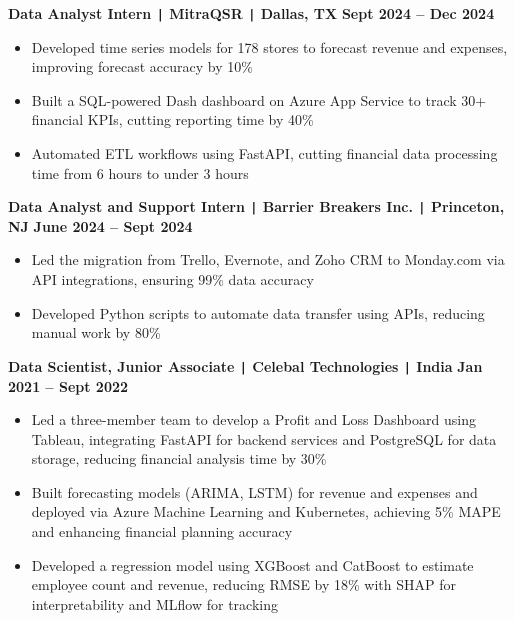 \documentclass[10pt]{article}
\begin{document}
\vspace{-0.2cm}
\noindent
\textbf{Data Analyst Intern \texttt{|} MitraQSR \texttt{|} Dallas, TX} \hfill \textbf{Sept 2024 -- Dec 2024} 
\vspace{-0.15cm}
\begin{itemize}[leftmargin=0.5cm, itemsep=0pt]

    \item Developed time series models for 178 stores to forecast revenue and expenses, improving forecast accuracy by 10\%

    \item Built a SQL-powered Dash dashboard on Azure App Service to track 30+ financial KPIs, cutting reporting time by 40\%

    \item Automated ETL workflows using FastAPI, cutting financial data processing time from 6 hours to under 3 hours

\end{itemize}

\vspace{-0.2cm}
\noindent
\textbf{Data Analyst and Support Intern \texttt{|} Barrier Breakers Inc. \texttt{|} Princeton, NJ} \hfill \textbf{June 2024 -- Sept 2024} 
\vspace{-0.15cm}
\begin{itemize}[leftmargin=0.5cm, itemsep=0pt]

    \item Led the migration from Trello, Evernote, and Zoho CRM to Monday.com via API integrations, ensuring 99\% data accuracy

    \item Developed Python scripts to automate data transfer using APIs, reducing manual work by 80\%

\end{itemize}

\vspace{-0.2cm}
\noindent
\textbf{Data Scientist, Junior Associate \texttt{|} Celebal Technologies \texttt{|} India} \hfill \textbf{Jan 2021 -- Sept 2022} 
\vspace{-0.15cm}
\begin{itemize}[leftmargin=0.5cm, itemsep=0pt]

    \item Led a three-member team to develop a Profit and Loss Dashboard using Tableau, integrating FastAPI for backend services and PostgreSQL for data storage, reducing financial analysis time by 30\%

    \item Built forecasting models (ARIMA, LSTM) for revenue and expenses and deployed via Azure Machine Learning and Kubernetes, achieving 5\% MAPE and enhancing financial planning accuracy

    \item Developed a regression model using XGBoost and CatBoost to estimate employee count and revenue, reducing RMSE by 18\% with SHAP for interpretability and MLflow for tracking

\end{itemize}
\end{document}

